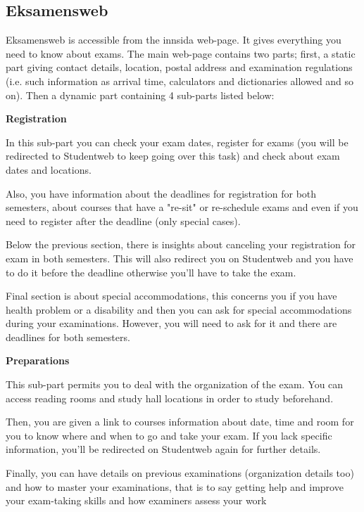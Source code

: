 \subsection{Eksamensweb}

Eksamensweb is accessible from the innsida web-page. It gives everything you need to know about 
exams. The main web-page contains two parts; first, a static part giving contact details, location, 
postal address and examination regulations (i.e. such information as arrival time, calculators and 
dictionaries allowed and so on). Then a dynamic part containing 4 sub-parts listed below:

{\small{\textbf{Registration}}}

In this sub-part you can check your exam dates, register for exams (you will be redirected to 
Studentweb to keep going over this task) and check about exam dates and locations.
\par
Also, you have information about the deadlines for registration for both semesters, about 
courses that have a "re-sit" or re-schedule exams and even if you need to register after the 
deadline (only special cases).
\par
Below the previous section, there is insights about canceling your registration for exam in 
both semesters. This will also redirect you on Studentweb and you have to do it before the deadline otherwise you'll have to take the exam.
\par
Final section is about special accommodations, this concerns you if you have health problem 
or a disability and then you can ask for special accommodations during your examinations. 
However, you will need to ask for it and there are deadlines for both semesters.

{\small{\textbf{Preparations}}}

This sub-part permits you to deal with the organization of the exam. You can access reading rooms and study hall locations in order to study beforehand.
\par
Then, you are given a link to courses information about date, time and room for you to know where and when to go and take your exam. If you lack specific information, you'll be redirected on Studentweb again for further details.
\par
Finally, you can have details on previous examinations (organization details too) and how to 
master your examinations, that is to say getting help and improve your exam-taking skills and 
how examiners assess your work

